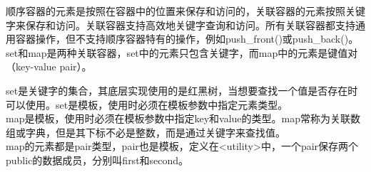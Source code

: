 顺序容器的元素是按照在容器中的位置来保存和访问的，关联容器的元素按照关键字来保存和访问。关联容器支持高效地关键字查询和访问。所有关联容器都支持通用容器操作，但不支持顺序容器特有的操作，例如push\_front()或push\_back()。\\

set和map是两种关联容器，set中的元素只包含关键字，而map中的元素是键值对（key-value pair）。

\begin{table}[H]
	\centering
	\caption{关联容器}
\end{table}

set是关键字的集合，其底层实现使用的是红黑树，当想要查找一个值是否存在时可以使用。set是模板，使用时必须在模板参数中指定元素类型。\\

map是模板，使用时必须在模板参数中指定key和value的类型。map常称为关联数组或字典，但是其下标不必是整数，而是通过关键字来查找值。\\

map的元素都是pair类型，pair也是模板，定义在<utility>中，一个pair保存两个public的数据成员，分别叫first和second。\\



